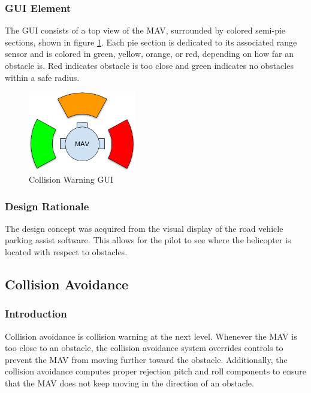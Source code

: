 \documentclass[onecolumn, draftclsnofoot, 10pt, compsoc]{IEEEtran}
\begin{document}
\subsubsection{GUI Element}
The GUI consists of a top view of the MAV, surrounded by colored semi-pie sections, shown in figure \ref{fig:ColWarGUI}. Each pie section is dedicated to its associated range sensor and is colored in green, yellow, orange, or red, depending on how far an obstacle is. Red indicates obstacle is too close and green indicates no obstacles within a safe radius.
\begin{figure}[h]
    \centering
    \includegraphics[height=3.5cm]{graphics/collision_warning_gui.png}
    \caption{Collision Warning GUI}
    \label{fig:ColWarGUI}
\end{figure}

\subsubsection{Design Rationale}
The design concept was acquired from the visual display of the road vehicle parking assist software. This allows for the pilot to see where the helicopter is located with respect to obstacles.

\subsection{Collision Avoidance}
\subsubsection{Introduction}
Collision avoidance is collision warning at the next level. Whenever the MAV is too close to an obstacle, the collision avoidance system overrides controls to prevent the MAV from moving further toward the obstacle. Additionally, the collision avoidance computes proper rejection pitch and roll components to ensure that the MAV does not keep moving in the direction of an obstacle.
\end{document}
